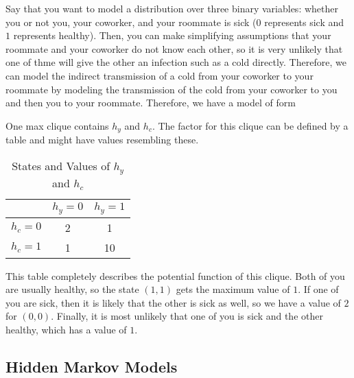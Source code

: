   \begin{example} 
    Say that you want to model a distribution over three binary variables: whether you or not you, your coworker, and your roommate is sick ($0$ represents sick and $1$ represents healthy). Then, you can make simplifying assumptions that your roommate and your coworker do not know each other, so it is very unlikely that one of thme will give the other an infection such as a cold directly. Therefore, we can model the indirect transmission of a cold from your coworker to your roommate by modeling the transmission of the cold from your coworker to you and then you to your roommate. Therefore, we have a model of form

    \begin{center}
    \end{center}
    One max clique contains $h_y$ and $h_c$. The factor for this clique can be defined by a table and might have values resembling these. 

    \begin{table}[H]
      \centering
      \begin{tabular}{c|c|c|}
      \cline{2-3}
      & \( h_y = 0 \) & \( h_y = 1 \) \\ \hline
      \multicolumn{1}{|c|}{\( h_c = 0 \)} & 2 & 1 \\ \hline
      \multicolumn{1}{|c|}{\( h_c = 1 \)} & 1 & 10 \\ \hline
      \end{tabular}
      \caption{States and Values of \( h_y \) and \( h_c \)}
    \end{table}

    This table completely describes the potential function of this clique. Both of you are usually healthy, so the state $(1, 1)$ gets the maximum value of $1$. If one of you are sick, then it is likely that the other is sick as well, so we have a value of $2$ for $(0, 0)$. Finally, it is most unlikely that one of you is sick and the other healthy, which has a value of $1$. 
  \end{example}

\subsection{Hidden Markov Models}

